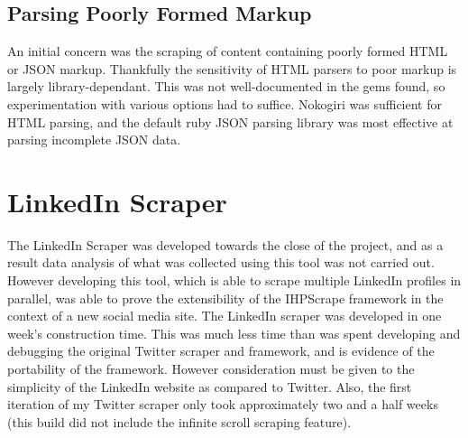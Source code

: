 \subsection{Parsing Poorly Formed Markup}

An initial concern was the scraping of content containing poorly formed HTML or JSON markup. Thankfully the sensitivity of HTML parsers to poor markup is largely library-dependant. This was not well-documented in the gems found, so experimentation with various options had to suffice. Nokogiri was sufficient for HTML parsing, and the default ruby JSON parsing library was most effective at parsing incomplete JSON data.










\section{LinkedIn Scraper}

The LinkedIn Scraper was developed towards the close of the project, and as a result data analysis of what was collected using this tool was not carried out. However developing this tool, which is able to scrape multiple LinkedIn profiles in parallel, was able to prove the extensibility of the IHPScrape framework in the context of a new social media site. The LinkedIn scraper was developed in one week's construction time. This was much less time than was spent developing and debugging the original Twitter scraper and framework, and is evidence of the portability of the framework. However consideration must be given to the simplicity of the LinkedIn website as compared to Twitter. Also, the first iteration of my Twitter scraper only took approximately two and a half weeks (this build did not include the infinite scroll scraping feature). 

